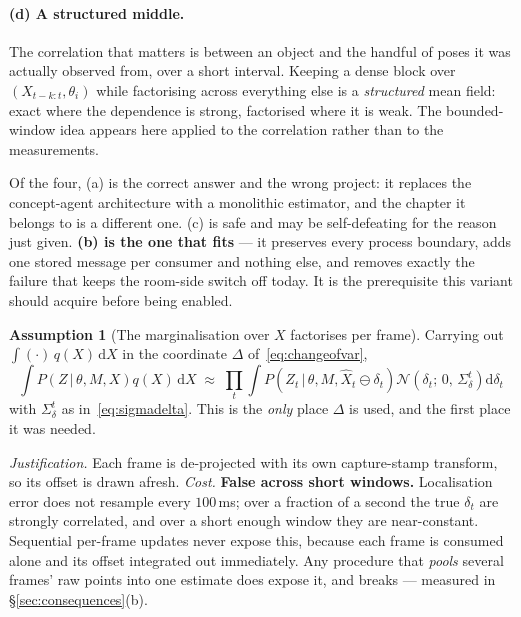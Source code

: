 \documentclass[11pt,a4paper]{report}
\newcommand{\given}{\,|\,}
\theoremstyle{definition}   %
\newtheorem{assumption}{Assumption}
\begin{document}
\paragraph{(d) A structured middle.} The correlation that matters is between an object and the
handful of poses it was actually observed from, over a short interval. Keeping a dense block over
$(X_{t-k:t},\theta_i)$ while factorising across everything else is a \emph{structured} mean field:
exact where the dependence is strong, factorised where it is weak. The bounded-window idea appears
here applied to the correlation rather than to the measurements.

\medskip\noindent
Of the four, (a) is the correct answer and the wrong project: it replaces the concept-agent
architecture with a monolithic estimator, and the chapter it belongs to is a different one. (c) is
safe and may be self-defeating for the reason just given. \textbf{(b) is the one that fits} --- it
preserves every process boundary, adds one stored message per consumer and nothing else, and
removes exactly the failure that keeps the room-side switch off today. It is the prerequisite this
variant should acquire before being enabled.

\begin{assumption}[The marginalisation over $X$ factorises per frame]\label{as:frames}
Carrying out $\int(\cdot)\,q(X)\,\mathrm{d}X$ in the coordinate $\Delta$ of~\eqref{eq:changeofvar},
\begin{equation}
\int P\!\left(Z\given\theta,M,X\right)q(X)\,\mathrm{d}X
\;\approx\;
\prod_t \int P\!\left(Z_t\given\theta,M,\hat X_t\ominus\delta_t\right)
\mathcal{N}\!\left(\delta_t;\,0,\,\Sigma_\delta^t\right)\mathrm{d}\delta_t
\label{eq:perframe}
\end{equation}
with $\Sigma_\delta^t$ as in~\eqref{eq:sigmadelta}. This is the \emph{only} place $\Delta$ is
used, and the first place it was needed.
\end{assumption}
\noindent\textit{Justification.} Each frame is de-projected with its own capture-stamp transform,
so its offset is drawn afresh. \textit{Cost.} \textbf{False across short windows.} Localisation
error does not resample every $100$\,ms; over a fraction of a second the true $\delta_t$ are
strongly correlated, and over a short enough window they are near-constant. Sequential per-frame
updates never expose this, because each frame is consumed alone and its offset integrated out
immediately. Any procedure that \emph{pools} several frames' raw points into one estimate does
expose it, and breaks --- measured in \S\ref{sec:consequences}(b).
\end{document}
